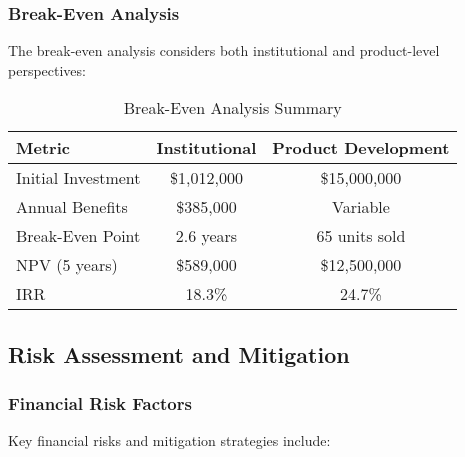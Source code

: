 \subsubsection{Break-Even Analysis}
The break-even analysis considers both institutional and product-level perspectives:

\begin{table}[htbp]
\centering
\caption{Break-Even Analysis Summary}
\label{tab:breakeven-analysis}
\begin{tabular}{|l|c|c|}
\hline
\textbf{Metric} & \textbf{Institutional} & \textbf{Product Development} \\
\hline
Initial Investment & \$1,012,000 & \$15,000,000 \\
Annual Benefits & \$385,000 & Variable \\
Break-Even Point & 2.6 years & 65 units sold \\
NPV (5 years) & \$589,000 & \$12,500,000 \\
IRR & 18.3\% & 24.7\% \\
\hline
\end{tabular}
\end{table}

\subsection{Risk Assessment and Mitigation}

\subsubsection{Financial Risk Factors}
Key financial risks and mitigation strategies include:

